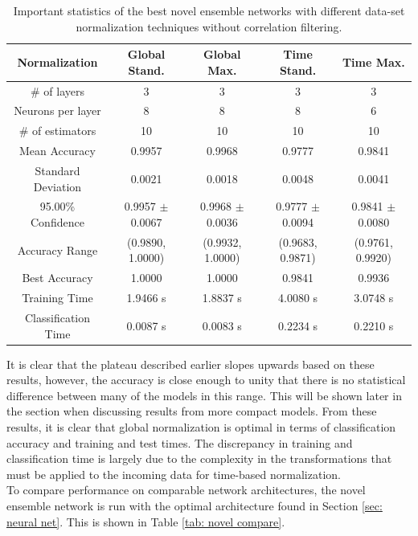 \documentclass[paper=a4, fontsize=11pt]{scrartcl} %
\begin{document}
\begin{table}[H]
	\centering\small
	\caption{Important statistics of the best novel ensemble networks with different data-set normalization techniques without correlation filtering.}
	\begin{tabular}{|c||c|c|c|c|}
		\hline
		\textbf{Normalization} & \textbf{Global Stand.} & \textbf{Global Max.} & \textbf{Time Stand.} & \textbf{Time Max.} \\ \hline \hline
		\# of layers & 3 & 3 & 3 & 3 \\ \hline
		Neurons per layer & 8 & 8 & 8 & 6 \\ \hline	
		\# of estimators & 10 & 10 & 10 & 10 \\ \hline
		Mean Accuracy & 0.9957 & 0.9968 & 0.9777 & 0.9841 \\ \hline
		Standard Deviation & 0.0021 & 0.0018 & 0.0048 & 0.0041 \\ \hline
		95.00\% Confidence & 0.9957 $\pm$ 0.0067 & 0.9968 $\pm$ 0.0036 & 0.9777 $\pm$ 0.0094 & 0.9841 $\pm$ 0.0080 \\ \hline
		Accuracy Range & (0.9890, 1.0000) & (0.9932, 1.0000) & (0.9683, 0.9871) & (0.9761, 0.9920) \\ \hline
		Best Accuracy & 1.0000 & 1.0000 & 0.9841 & 0.9936 \\ \hline
		Training Time & 1.9466 s & 1.8837 s & 4.0080 s & 3.0748 s \\ \hline
		Classification Time & 0.0087 s & 0.0083 s & 0.2234 s & 0.2210 s \\ \hline
	\end{tabular}
	\label{tab: novel best}
\end{table}

It is clear that the plateau described earlier slopes upwards based on these results, however, the accuracy is close enough to unity that there is no statistical difference between many of the models in this range.
This will be shown later in the section when discussing results from more compact models.
From these results, it is clear that global normalization is optimal in terms of classification accuracy and training and test times.
The discrepancy in training and classification time is largely due to the complexity in the transformations that must be applied to the incoming data for time-based normalization.
\\

To compare performance on comparable network architectures, the novel ensemble network is run with the optimal architecture found in Section \ref{sec: neural net}.
This is shown in Table \ref{tab: novel compare}.
\end{document}
